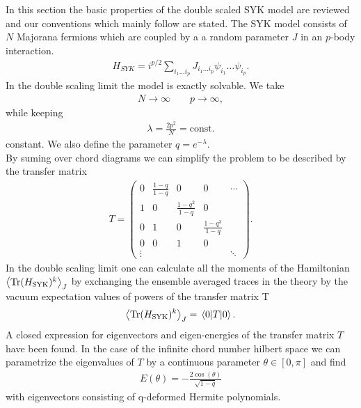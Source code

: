 \documentclass[11pt,a4paper]{article}
\begin{document}
In this section the basic properties of the double scaled SYK model are reviewed and our conventions which mainly follow \cite{Berkooz:2018jqr} are stated.
The SYK model consists of $N$ Majorana fermions which are coupled by a a random parameter $J$ in an $p$-body interaction.
\begin{align}
	H_{SYK} = i^{p/2} \sum_{i_1...i_p} J_{i_1 \dots i_p} \psi_{i_1} \dots \psi_{i_p}.
	\label{eq:SYK_Hamiltonian}
\end{align}
In the double scaling limit the model is exactly solvable. We take
\begin{align}
	N \rightarrow \infty  \qquad p \rightarrow \infty,
\end{align}
while keeping 
\begin{align}
	\lambda = \frac{2 p^2}{N} = \mathrm{const.}
	\label{eq:lambda}
\end{align}
constant. We also define the parameter $q = e^{-\lambda}$. \\
By suming over chord diagrams we can simplify the problem to be described by the transfer matrix 
\begin{align}
    T = 
    \begin{pmatrix}
        0 & \frac{1-q}{1-q} & 0 & 0 & \cdots \\
        1 & 0 & \frac{1-q^2}{1-q} & 0 \\
        0 & 1 & 0 & \frac{1-q^3}{1-q} &  \\
        0 & 0 & 1 & 0  \\
         \vdots & & & & \ddots
    \end{pmatrix}
    .
\end{align}
In the double scaling limit one can calculate all the moments of the Hamiltonian $\ev{\mathrm{Tr}(H_\mathrm{SYK})^{k}}_J$ by exchanging the ensemble averaged traces in the theory by the vacuum expectation values of powers of the transfer matrix T
\begin{align}
    \ev{\mathrm{Tr}(H_\mathrm{SYK})^{k}}_J = \ev{T}{0}.
\end{align}
A closed expression for eigenvectors and eigen-energies of the transfer matrix $T$ have been found. In the case of the infinite chord number hilbert space we can parametrize the eigenvalues of $T$ by a continuous parameter $\theta \in [0, \pi ]$ and find
\begin{align}
    E(\theta) = - \frac{2 \cos(\theta)}{\sqrt{1-q}}
    \label{eq:eigenvalues_T}
\end{align}
with eigenvectors consisting of q-deformed Hermite polynomials.\\
\end{document}
